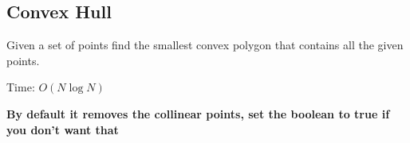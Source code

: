 \subsection{Convex Hull}

Given a set of points find the smallest convex polygon that contains all the given points.

Time: $O(N\log{N})$

\textbf{By default it removes the collinear points, set the boolean to true if you don't want that}

